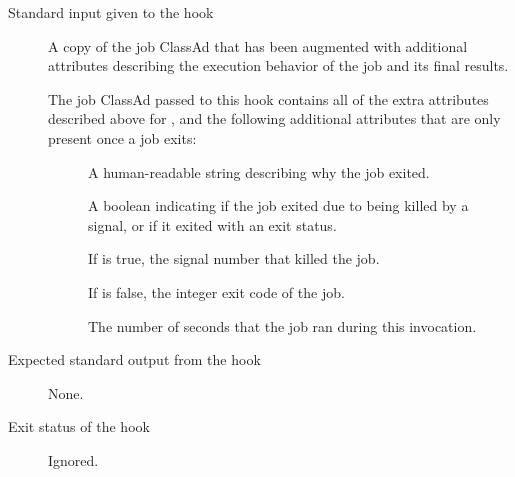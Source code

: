 \begin{itemize}
\begin{description}
\item[Standard input given to the hook]
  A copy of the job ClassAd that has been augmented with additional
  attributes describing the execution behavior of the job and its
  final results.

The job ClassAd passed to this hook contains all of the extra
attributes described above for , and
the following additional attributes that are only present once a job
exits:
\begin{description}
\item[]
  A human-readable string describing why the job exited.

\item[]
  A boolean indicating if the job exited due to being killed by a
  signal, or if it exited with an exit status.

\item[]
  If  is true, the signal number that killed the job.

\item[]
  If  is false, the integer exit code of the job.

\item[]
  The number of seconds that the job ran during this invocation.
\end{description}

\item[Expected standard output from the hook]
  None.

\item[Exit status of the hook]
  Ignored.
\end{description}


% 

\end{itemize}

